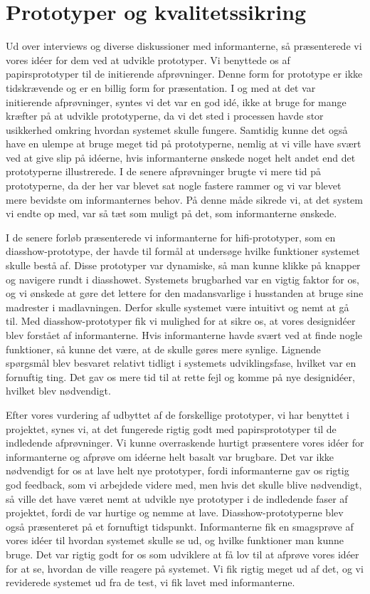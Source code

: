 \section{Prototyper og kvalitetssikring}
Ud over interviews og diverse diskussioner med informanterne, så præsenterede vi vores idéer for dem ved at udvikle prototyper. Vi benyttede os af papirsprototyper til de initierende afprøvninger. Denne form for prototype er ikke tidskrævende og er en billig form for præsentation. I og med at det var initierende afprøvninger, syntes vi det var en god idé, ikke at bruge for mange kræfter på at udvikle prototyperne, da vi det sted i processen havde stor usikkerhed omkring hvordan systemet skulle fungere. Samtidig kunne det også have en ulempe at bruge meget tid på prototyperne, nemlig at vi ville have svært ved at give slip på idéerne, hvis informanterne ønskede noget helt andet end det prototyperne illustrerede. I de senere afprøvninger brugte vi mere tid på prototyperne, da der her var blevet sat nogle fastere rammer og vi var blevet mere bevidste om informanternes behov. På denne måde sikrede vi, at det system vi endte op med, var så tæt som muligt på det, som informanterne ønskede.

I de senere forløb præsenterede vi informanterne for hifi-prototyper, som \fx en diasshow-prototype, der havde til formål at undersøge hvilke funktioner systemet skulle bestå af. Disse prototyper var dynamiske, så man kunne klikke på knapper og navigere rundt i diasshowet. Systemets brugbarhed var en vigtig faktor for os, og vi ønskede at gøre det lettere for den madansvarlige i husstanden at bruge sine madrester i madlavningen. Derfor skulle systemet være intuitivt og nemt at gå til. Med diasshow-prototyper fik vi mulighed for at sikre os, at vores designidéer blev forstået af informanterne. Hvis informanterne \fx havde svært ved at finde nogle funktioner, så kunne det være, at de skulle gøres mere synlige. Lignende spørgsmål blev besvaret relativt tidligt i systemets udviklingsfase, hvilket var en fornuftig ting. Det gav os mere tid til at rette fejl og komme på nye designidéer, hvilket blev nødvendigt.

Efter vores vurdering af udbyttet af de forskellige prototyper, vi har benyttet i projektet, synes vi, at det fungerede rigtig godt med papirsprototyper til de indledende afprøvninger. Vi kunne overraskende hurtigt præsentere vores idéer for informanterne og afprøve om idéerne helt basalt var brugbare. Det var ikke nødvendigt for os at lave helt nye prototyper, fordi informanterne gav os rigtig god feedback, som vi arbejdede videre med, men hvis det skulle blive nødvendigt, så ville det have været nemt at udvikle nye prototyper i de indledende faser af projektet, fordi de var hurtige og nemme at lave. Diasshow-prototyperne blev også præsenteret på et fornuftigt tidspunkt. Informanterne fik en smagsprøve af vores idéer til hvordan systemet skulle se ud, og hvilke funktioner man kunne bruge. Det var rigtig godt for os som udviklere at få lov til at afprøve vores idéer for at se, hvordan de ville reagere på systemet. Vi fik rigtig meget ud af det, og vi reviderede systemet ud fra de test, vi fik lavet med informanterne.

